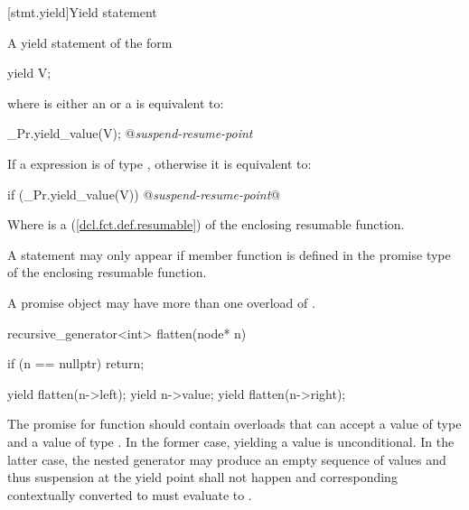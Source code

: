 %

[stmt.yield]{Yield statement}%

\pnum
A yield statement of the form

\begin{codeblock}
  yield V;
\end{codeblock}

where  is either an  or a  is equivalent to:

\begin{codeblock}
  _Pr.yield_value(V);
  @\textit{suspend-resume-point}
\end{codeblock}

If a  expression is of type , otherwise it is equivalent to:

\begin{codeblock}
  if (_Pr.yield_value(V)) {
    @\textit{suspend-resume-point}@
  }
\end{codeblock}

Where  is a  (\ref{dcl.fct.def.resumable}) of the enclosing resumable function.

\pnum
A  statement may only appear if  member
function is defined in the promise type of the enclosing resumable function.

\pnum
A promise object may have more than one overload of .

\enterexample
\begin{codeblock}
  recursive_generator<int> flatten(node* n)
  {
    if (n == nullptr)
      return;
    
    yield flatten(n->left);
    yield n->value;
    yield flatten(n->right);
  }
\end{codeblock}

The promise for  function should contain overloads that can accept a value of type  and a value of type .
In the former case, yielding a value is unconditional. In the latter case, the nested generator may produce an empty sequence of values and thus suspension at the yield point shall not happen and corresponding  contextually converted to  must evaluate to . 
\exitexample
